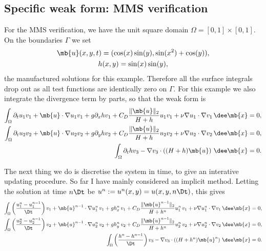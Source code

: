 \documentclass[11pt]{article}
\begin{document}
\subsection*{Specific weak form: MMS verification}

For the MMS verification, we have the unit square domain
$\Omega = [0, 1] \times [0, 1]$. On the boundaries $\Gamma$ we set
\begin{gather*}
  \mb{u}(x, y, t) = (\cos(x)\sin(y), \sin(x^2) + \cos(y)), \\
  h(x, y) = \sin(x)\sin(y),
\end{gather*}
the manufactured solutions for this example. Therefore all the surface integrals
drop out as all test functions are identically zero on $\Gamma$. For this
example we also integrate the divergence term by parts, so that the weak form is
\begin{align*}
  \int_\Omega
  \partial_t u_1 v_1 +  \mb{u} \cdot \nabla u_1 v_1 +  g \partial_x h v_1
  + C_D \frac{\lVert \mb{u} \rVert_2}{H + h} u_1 v_1
  + \nu \nabla u_1 \cdot \nabla v_1 \, \dee \mb{x} &= 0, \\
  \int_\Omega \partial_t u_2 v_2 +  \mb{u} \cdot \nabla u_2 v_2 +  g \partial_y h v_2
  + C_D \frac{\lVert \mb{u} \rVert_2}{H + h} u_2 v_2
  + \nu \nabla u_2 \cdot \nabla v_2 \, \dee \mb{x} &= 0, \\
  \int_\Omega \partial_t h v_3
  - \nabla v_3 \cdot \left( (H + h) \mb{u} \right) \, \dee \mb{x} &= 0.
\end{align*}

The next thing we do is discretise the system in time, to give an interative
updating procedure. So far I have mainly considered an implicit method. Letting
the solution at time $n \Dt$ be $u^n := u^n(x, y) = u(x, y, n \Dt)$, this gives
\begin{align*}
  \int_\Omega
  \left(\frac{ u_1^n - u_1^{n - 1}}{\Dt} \right) v_1
  + \mb{u}^{n - 1} \cdot \nabla u_1^n \, v_1
  + g h_x^n \, v_1
  + C_D \frac{\lVert \mb{u}^{n - 1} \rVert_2}{H + h^n} u_1^n \, v_1
  + \nu \nabla u_1^n \cdot \nabla v_1 \, \dee \mb{x} &= 0, \\
  \int_\Omega \left( \frac{u_2^n - u_2^{n - 1}}{\Dt} \right) v_2
  + \mb{u}^{n - 1} \cdot \nabla u_2^n \, v_2
  + g h_y^n \, v_2
  + C_D \frac{\lVert \mb{u}^{n - 1} \rVert_2}{H + h^n} u_2^n \, v_2
  + \nu \nabla u_2^n \cdot \nabla v_2 \, \dee \mb{x} &= 0, \\
  \int_\Omega \left( \frac{h^n - h^{n - 1}}{\Dt} \right) v_3
  - \nabla v_3 \cdot \left( (H + h^n) \mb{u}^n \right) \, \dee \mb{x} &= 0.
\end{align*}
\end{document}
